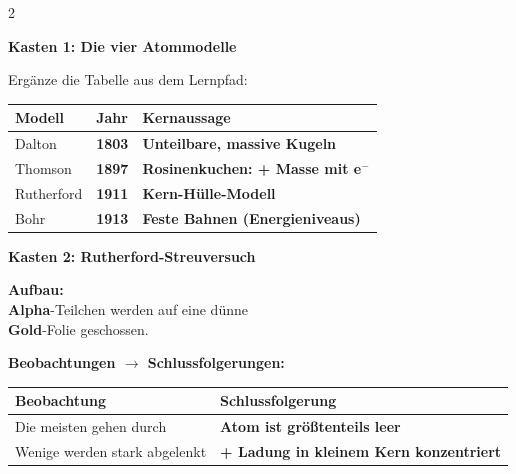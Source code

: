 \documentclass[10pt, a4paper]{article}
\newcommand{\fachfarbe}{physik}
\newcommand{\lsg}[1]{\textcolor{loesung}{\textbf{#1}}}
\newcommand{\abschnitt}[1]{%
    \vspace{8pt}
    \noindent\textbf{\textcolor{\fachfarbe}{#1}}
    \vspace{4pt}
}
\begin{document}
\begin{multicols}{2}
\small


\abschnitt{Kasten 1: Die vier Atommodelle}

\begin{merksatz}
Ergänze die Tabelle aus dem Lernpfad:

\vspace{6pt}

\renewcommand{\arraystretch}{1.6}
\begin{tabular}{|p{1.8cm}|p{0.8cm}|p{3.5cm}|}
\hline
\textbf{Modell} & \textbf{Jahr} & \textbf{Kernaussage} \\
\hline
Dalton & \lsg{1803} & \lsg{Unteilbare, massive Kugeln} \\
\hline
Thomson & \lsg{1897} & \lsg{Rosinenkuchen: + Masse mit e$^-$} \\
\hline
Rutherford & \lsg{1911} & \lsg{Kern-Hülle-Modell} \\
\hline
Bohr & \lsg{1913} & \lsg{Feste Bahnen (Energieniveaus)} \\
\hline
\end{tabular}
\renewcommand{\arraystretch}{1}
\end{merksatz}

\vspace{6pt}


\abschnitt{Kasten 2: Rutherford-Streuversuch}

\begin{merksatz}
\textbf{Aufbau:}\\
\lsg{Alpha}-Teilchen werden auf eine dünne\\
\lsg{Gold}-Folie geschossen.

\vspace{6pt}

\textbf{Beobachtungen $\rightarrow$ Schlussfolgerungen:}

\vspace{4pt}

\renewcommand{\arraystretch}{1.4}
\begin{tabular}{|p{2.8cm}|p{3.2cm}|}
\hline
\textbf{Beobachtung} & \textbf{Schlussfolgerung} \\
\hline
Die meisten gehen durch & \lsg{Atom ist größtenteils leer} \\
\hline
Wenige werden stark abgelenkt & \lsg{+ Ladung in kleinem Kern konzentriert} \\
\hline
\end{tabular}
\renewcommand{\arraystretch}{1}


\end{merksatz}
\end{multicols}
\end{document}
